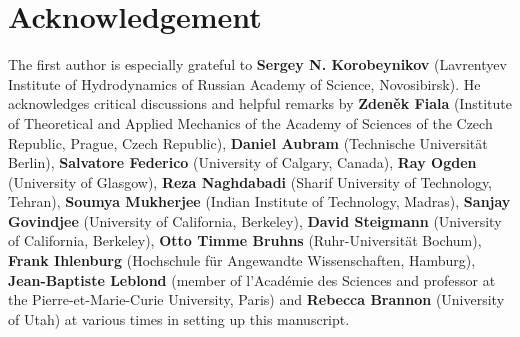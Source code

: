 \documentclass[10pt]{article}
\numberwithin{theoremCounter}{section}
\theoremstyle{plain}
\theoremstyle{definition}
\newcommand{\red}[1]{{\color{red}#1}}
\numberwithin{equation}{section}
\begin{document}
\footnotesize
%
\clearpage
%
\section{Acknowledgement}
%
The first author is especially grateful to \textbf{Sergey N. Korobeynikov} (Lavrentyev Institute of Hydrodynamics of Russian Academy of Science, Novosibirsk). He acknowledges critical discussions and helpful remarks by \textbf{Zden\v{e}k Fiala} (Institute of Theoretical and Applied Mechanics of the Academy of Sciences of the Czech Republic, Prague, Czech Republic), \textbf{Daniel Aubram} (Technische Universität Berlin), \textbf{Salvatore Federico} (University of Calgary, Canada), \textbf{Ray Ogden} (University of Glasgow), 
\textbf{Reza Naghdabadi} (Sharif University of Technology, Tehran), \textbf{Soumya Mukherjee} (Indian Institute of Technology, Madras), 
\textbf{Sanjay Govindjee} (University of California, Berkeley), \textbf{David Steigmann} (University of California, Berkeley), \textbf{Otto Timme Bruhns} (Ruhr-Universität Bochum), \textbf{Frank Ihlenburg} (Hochschule für Angewandte Wissenschaften, Hamburg), \textbf{Jean-Baptiste Leblond} (member of l'Académie des Sciences and professor at the Pierre-et-Marie-Curie University, Paris) and \textbf{Rebecca Brannon} (University of Utah) at various times in setting up this manuscript. \\
\\
%
%
%
\printbibliography
%
%
\normalsize
%
\end{document}
